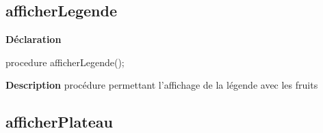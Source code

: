 \documentclass{report}
\newif\ifpdf
\begin{document}
\subsection*{afficherLegende}
\fi
\label{Affichage-afficherLegende}
\begin{list}{}{
\setlength{\itemindent}{0cm}
\setlength{\listparindent}{0cm}
\setlength{\leftmargin}{\evensidemargin}
\addtolength{\leftmargin}{\tmplength}
\settowidth{\labelsep}{X}
\addtolength{\leftmargin}{\labelsep}
\setlength{\labelwidth}{\tmplength}
}
\item[\textbf{Déclaration}\hfill]
\ifpdf
\begin{flushleft}
\fi
\begin{ttfamily}
procedure afficherLegende();\end{ttfamily}

\ifpdf
\end{flushleft}
\fi

\par
\item[\textbf{Description}]
procédure permettant l'affichage de la légende avec les fruits

\end{list}
\ifpdf
\subsection*{\large{\textbf{afficherPlateau}}\normalsize\hspace{1ex}\hrulefill}
\else
\end{document}
